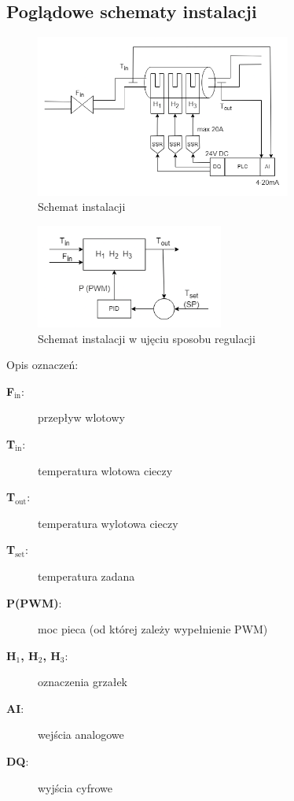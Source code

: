 \documentclass[a4paper,twoside,12pt]{book}
\begin{document}
\newpage
\subsection{Poglądowe schematy instalacji}
\begin{figure}[h]
	\centering
	\includegraphics[width=0.75\textwidth]{./img/system.png}
	\caption{Schemat instalacji}
	\label{fig:System}
\end{figure}

\begin{figure}[h]
	\centering
	\includegraphics[width=0.55\textwidth]{./img/systemRegulation.png}
	\caption{Schemat instalacji w ujęciu sposobu regulacji}
	\label{fig:System regulation}
\end{figure}

\noindent Opis oznaczeń:
\begin{description}
	\item[\textbf{F$_{\text{in}}$}:] przepływ wlotowy
	\item[\textbf{T$_{\text{in}}$}:] temperatura wlotowa cieczy
	\item[\textbf{T$_{\text{out}}$}:] temperatura wylotowa cieczy
	\item[\textbf{T$_{\text{set}}$}:] temperatura zadana
	\item[\textbf{P(PWM)}:] moc pieca (od której zależy wypełnienie PWM)
	\item[\textbf{H$_{\text{1}}$, H$_{\text{2}}$, H$_{\text{3}}$}:] oznaczenia grzałek
	\item[\textbf{AI}:] wejścia analogowe
	\item[\textbf{DQ}:] wyjścia cyfrowe
\end{description}
\end{document}

